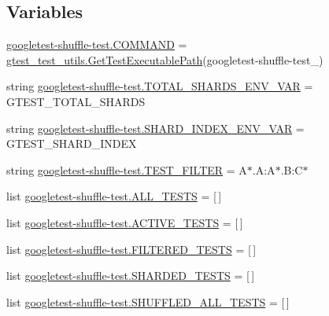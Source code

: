 \subsection*{Variables}
\begin{DoxyCompactItemize}
\item 
\mbox{\hyperlink{namespacegoogletest-shuffle-test_aaa6556c1d42101405b6dc40120a8d558}{googletest-\/shuffle-\/test.\+C\+O\+M\+M\+A\+ND}} = \mbox{\hyperlink{namespacegtest__test__utils_a89ed3717984a80ffbb7a9c92f71b86a2}{gtest\+\_\+test\+\_\+utils.\+Get\+Test\+Executable\+Path}}(\textquotesingle{}googletest-\/shuffle-\/test\+\_\+\textquotesingle{})
\item 
string \mbox{\hyperlink{namespacegoogletest-shuffle-test_ac2509ea0174cb21b19366da457b15d59}{googletest-\/shuffle-\/test.\+T\+O\+T\+A\+L\+\_\+\+S\+H\+A\+R\+D\+S\+\_\+\+E\+N\+V\+\_\+\+V\+AR}} = \textquotesingle{}G\+T\+E\+S\+T\+\_\+\+T\+O\+T\+A\+L\+\_\+\+S\+H\+A\+R\+DS\textquotesingle{}
\item 
string \mbox{\hyperlink{namespacegoogletest-shuffle-test_a6657b8fa720718e0a5a98830a4ab8b71}{googletest-\/shuffle-\/test.\+S\+H\+A\+R\+D\+\_\+\+I\+N\+D\+E\+X\+\_\+\+E\+N\+V\+\_\+\+V\+AR}} = \textquotesingle{}G\+T\+E\+S\+T\+\_\+\+S\+H\+A\+R\+D\+\_\+\+I\+N\+D\+EX\textquotesingle{}
\item 
string \mbox{\hyperlink{namespacegoogletest-shuffle-test_af6195f669ffc722f6fca899633c8cbb1}{googletest-\/shuffle-\/test.\+T\+E\+S\+T\+\_\+\+F\+I\+L\+T\+ER}} = \textquotesingle{}A$\ast$.A\+:A$\ast$.B\+:C$\ast$\textquotesingle{}
\item 
list \mbox{\hyperlink{namespacegoogletest-shuffle-test_a81ef160d77cc04634a4c4dee2257aa19}{googletest-\/shuffle-\/test.\+A\+L\+L\+\_\+\+T\+E\+S\+TS}} = \mbox{[}$\,$\mbox{]}
\item 
list \mbox{\hyperlink{namespacegoogletest-shuffle-test_a139508332a2fce934a41df9a6c2b2426}{googletest-\/shuffle-\/test.\+A\+C\+T\+I\+V\+E\+\_\+\+T\+E\+S\+TS}} = \mbox{[}$\,$\mbox{]}
\item 
list \mbox{\hyperlink{namespacegoogletest-shuffle-test_a64c2029cc53f8e30ffbe8f063b19596e}{googletest-\/shuffle-\/test.\+F\+I\+L\+T\+E\+R\+E\+D\+\_\+\+T\+E\+S\+TS}} = \mbox{[}$\,$\mbox{]}
\item 
list \mbox{\hyperlink{namespacegoogletest-shuffle-test_a366d969733d027bc719c01be5e4320c8}{googletest-\/shuffle-\/test.\+S\+H\+A\+R\+D\+E\+D\+\_\+\+T\+E\+S\+TS}} = \mbox{[}$\,$\mbox{]}
\item 
list \mbox{\hyperlink{namespacegoogletest-shuffle-test_ad370fd5f9285bc7f0e0cdfa6547b83f2}{googletest-\/shuffle-\/test.\+S\+H\+U\+F\+F\+L\+E\+D\+\_\+\+A\+L\+L\+\_\+\+T\+E\+S\+TS}} = \mbox{[}$\,$\mbox{]}

\end{DoxyCompactItemize}

